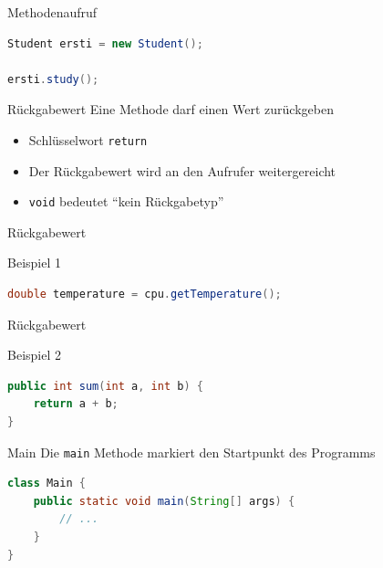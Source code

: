\documentclass[18pt]{beamer}
\begin{document}
\begin{frame}[fragile]{Methodenaufruf}
    \begin{exampleblock}{}
        \begin{lstlisting}[language=Java]
Student ersti = new Student();

ersti.study();
        \end{lstlisting}
    \end{exampleblock}
\end{frame}

\begin{frame}{Rückgabewert}
    Eine Methode darf einen Wert zurückgeben
    \begin{itemize}
        \item Schlüsselwort \texttt{return}
        \item Der Rückgabewert wird an den Aufrufer weitergereicht
        \item \texttt{void} bedeutet ``kein Rückgabetyp''
    \end{itemize}

\end{frame}

\begin{frame}[fragile]{Rückgabewert}
    \begin{exampleblock}{Beispiel 1}
        \begin{lstlisting}[language=Java]
double temperature = cpu.getTemperature();
        \end{lstlisting}
    \end{exampleblock}
\end{frame}

\begin{frame}[fragile]{Rückgabewert}
    \begin{exampleblock}{Beispiel 2}
        \begin{lstlisting}[language=Java]
public int sum(int a, int b) {
    return a + b;
}
        \end{lstlisting}
    \end{exampleblock}
\end{frame}

\begin{frame}[fragile]{Main}
    Die \texttt{main} Methode markiert den Startpunkt des Programms
    \begin{lstlisting}[language=Java]
class Main {
    public static void main(String[] args) {
        // ...
    }
}
    \end{lstlisting}
\end{frame}
\end{document}
